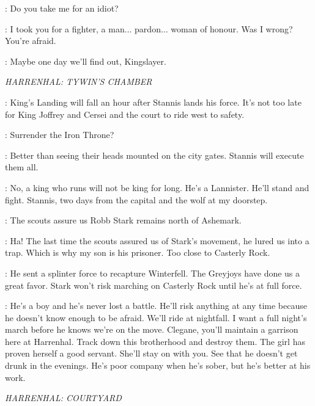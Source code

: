 \BRIENNE: Do you take me for an idiot?

\JAIME: I took you for a fighter, a man$\ldots$ pardon$\ldots$ woman of honour. Was I wrong? You're afraid. 

\BRIENNE: Maybe one day we'll find out, Kingslayer. 


\scene

\textit{HARRENHAL: TYWIN'S CHAMBER} 


\KEVAN: King's Landing will fall an hour after Stannis lands his force. It's not too late for King Joffrey and Cersei and the court to ride west to safety. 

\TYWIN: Surrender the Iron Throne? 

\KEVAN: Better than seeing their heads mounted on the city gates. Stannis will execute them all. 

\TYWIN: No, a king who runs will not be king for long. He's a Lannister. He'll stand and fight. Stannis, two days from the capital and the wolf at my doorstep. 

\KEVAN: The scouts assure us Robb Stark remains north of Ashemark. 

\TYWIN: Ha! The last time the scouts assured us of Stark's movement, he lured us into a trap. Which is why my son is his prisoner. Too close to Casterly Rock. 

\KEVAN: He sent a splinter force to recapture Winterfell. The Greyjoys have done us a great favor. Stark won't risk marching on Casterly Rock until he's at full force. 

\TYWIN: He's a boy and he's never lost a battle. He'll risk anything
at any time because he doesn't know enough to be afraid. We'll ride at
nightfall. I want a full night's march before he knows we're on the
move.  Clegane, you'll maintain a garrison
here at Harrenhal. Track down this brotherhood and destroy them. The
girl has proven herself a good servant. She'll stay on with
you.  See that he doesn't get drunk in the evenings. He's poor company when he's sober, but he's better at his work. 


\scene

\textit{HARRENHAL: COURTYARD} 



